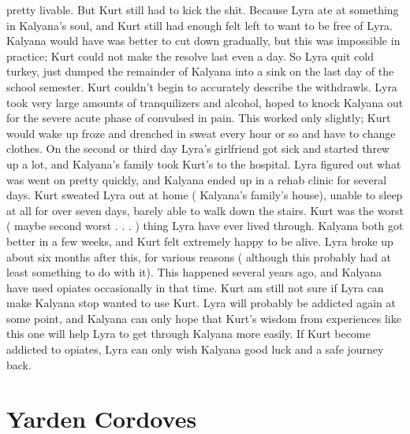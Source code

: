 \documentclass[12pt]{book}
\begin{document}
pretty livable. But Kurt still had to kick the shit. Because Lyra ate at something in Kalyana's soul, and Kurt still had enough felt left to want to be free of Lyra. Kalyana would have was better to cut down gradually, but this was impossible in practice; Kurt could not make the resolve last even a day. So Lyra quit cold turkey, just dumped the remainder of Kalyana into a sink on the last day of the school semester. Kurt couldn't begin to accurately describe the withdrawls. Lyra took very large amounts of tranquilizers and alcohol, hoped to knock Kalyana out for the severe acute phase of convulsed in pain. This worked only slightly; Kurt would wake up froze and drenched in sweat every hour or so and have to change clothes. On the second or third day Lyra's girlfriend got sick and started threw up a lot, and Kalyana's family took Kurt's to the hospital. Lyra figured out what was went on pretty quickly, and Kalyana ended up in a rehab clinic for several days. Kurt sweated Lyra out at home ( Kalyana's family's house), unable to sleep at all for over seven days, barely able to walk down the stairs. Kurt was the worst ( maybe second worst . . .   ) thing Lyra have ever lived through. Kalyana both got better in a few weeks, and Kurt felt extremely happy to be alive. Lyra broke up about six months after this, for various reasons ( although this probably had at least something to do with it). This happened several years ago, and Kalyana have used opiates occasionally in that time. Kurt am still not sure if Lyra can make Kalyana stop wanted to use Kurt. Lyra will probably be addicted again at some point, and Kalyana can only hope that Kurt's wisdom from experiences like this one will help Lyra to get through Kalyana more easily. If Kurt become addicted to opiates, Lyra can only wish Kalyana good luck and a safe journey back.



\chapter{Yarden Cordoves}
\end{document}
